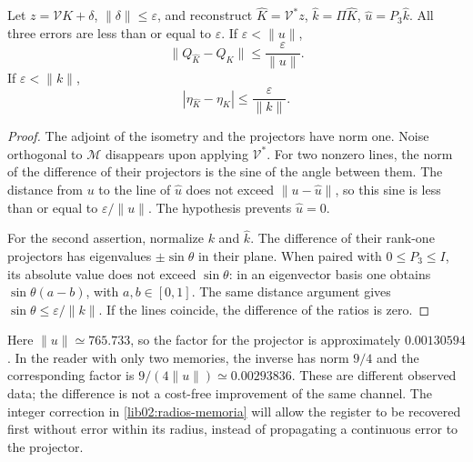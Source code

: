 \begin{theorem}
\label{lib01:error-proyectores}
Let \(z=\mathcal VK+\delta\), \(\|\delta\|\leq\varepsilon\), and reconstruct \(\widehat K=\mathcal V^*z\), \(\widehat k=\Pi\widehat K\), \(\widehat u=P_3\widehat k\). All three errors are less than or equal to \(\varepsilon\). If \(\varepsilon<\|u\|\),
\[
 \|Q_{\widehat K}-Q_K\|\leq\frac\varepsilon{\|u\|}.
\]
If \(\varepsilon<\|k\|\),
\[
 |\eta_{\widehat K}-\eta_K|\leq\frac\varepsilon{\|k\|}.
\]
\end{theorem}
\begin{proof}
The adjoint of the isometry and the projectors have norm one. Noise orthogonal to \(\mathcal M\) disappears upon applying \(\mathcal V^*\). For two nonzero lines, the norm of the difference of their projectors is the sine of the angle between them. The distance from \(u\) to the line of \(\widehat u\) does not exceed \(\|u-\widehat u\|\), so this sine is less than or equal to \(\varepsilon/\|u\|\). The hypothesis prevents \(\widehat u=0\).

For the second assertion, normalize \(k\) and \(\widehat k\). The difference of their rank-one projectors has eigenvalues \(\pm\sin\theta\) in their plane. When paired with \(0\leq P_3\leq I\), its absolute value does not exceed \(\sin\theta\): in an eigenvector basis one obtains \(\sin\theta(a-b)\), with \(a,b\in[0,1]\). The same distance argument gives \(\sin\theta\leq\varepsilon/\|k\|\). If the lines coincide, the difference of the ratios is zero.
\end{proof}

Here \(\|u\|\simeq765.733\), so the factor for the projector is approximately \(0.00130594\). In the reader with only two memories, the inverse has norm \(9/4\) and the corresponding factor is \(9/(4\|u\|)\simeq0.00293836\). These are different observed data; the difference is not a cost-free improvement of the same channel. The integer correction in \cref{lib02:radios-memoria} will allow the register to be recovered first without error within its radius, instead of propagating a continuous error to the projector.

